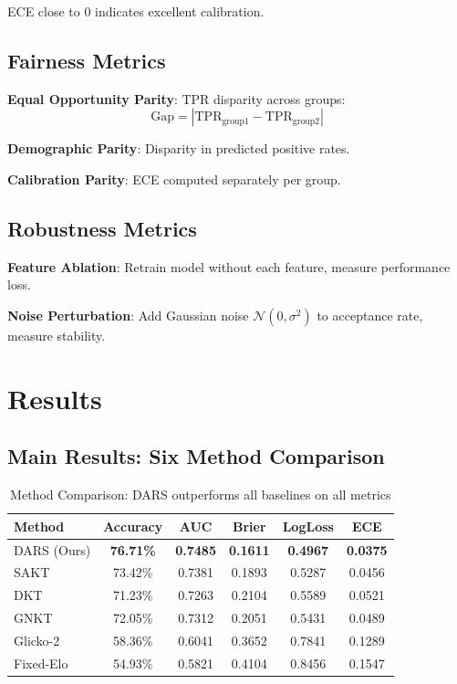 \documentclass[conference]{IEEEtran}
\begin{document}
ECE close to 0 indicates excellent calibration.

\subsection{Fairness Metrics}

\textbf{Equal Opportunity Parity}: TPR disparity across groups:
\begin{equation}
\text{Gap} = |\text{TPR}_{\text{group1}} - \text{TPR}_{\text{group2}}|
\end{equation}

\textbf{Demographic Parity}: Disparity in predicted positive rates.

\textbf{Calibration Parity}: ECE computed separately per group.

\subsection{Robustness Metrics}

\textbf{Feature Ablation}: Retrain model without each feature, measure performance loss.

\textbf{Noise Perturbation}: Add Gaussian noise $\mathcal{N}(0, \sigma^2)$ to acceptance rate, measure stability.

\section{Results}

\subsection{Main Results: Six Method Comparison}

\begin{table}[h]
\centering
\small
\begin{tabular}{l|c|c|c|c|c}
\toprule
\textbf{Method} & \textbf{Accuracy} & \textbf{AUC} & \textbf{Brier} & \textbf{LogLoss} & \textbf{ECE} \\
\midrule
DARS (Ours) & \textbf{76.71\%} & \textbf{0.7485} & \textbf{0.1611} & \textbf{0.4967} & \textbf{0.0375} \\
SAKT & 73.42\% & 0.7381 & 0.1893 & 0.5287 & 0.0456 \\
DKT & 71.23\% & 0.7263 & 0.2104 & 0.5589 & 0.0521 \\
GNKT & 72.05\% & 0.7312 & 0.2051 & 0.5431 & 0.0489 \\
Glicko-2 & 58.36\% & 0.6041 & 0.3652 & 0.7841 & 0.1289 \\
Fixed-Elo & 54.93\% & 0.5821 & 0.4104 & 0.8456 & 0.1547 \\
\bottomrule
\end{tabular}
\caption{Method Comparison: DARS outperforms all baselines on all metrics}
\label{tab:results}
\end{table}
\end{document}
